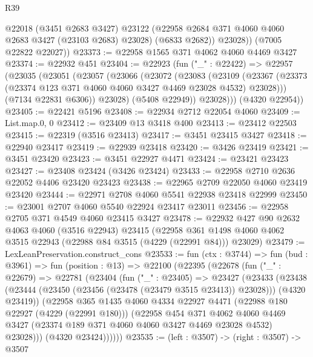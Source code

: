 \begin{lexlean}{R39}
\begin{coremodule}
            @22018
            (@3451 @2683 @3427)
            @23122
            (@22958 @2684 @371 @4060 @4060 @2683 @3427 (@23103 @2683) @23028)
            (@6833 @2682))
          @23028))
      (@7005 @22822 @22027))
@23373 := @22958 @1565 @371 @4062 @4060 @4469 @3427
@23374 := @22932 @451
@23404 := @22923
    (fun ("_" : @22422) =>
    @22957
      (@23035
        (@23051
          (@23057
            (@23066
              (@23072
                (@23083
                  (@23109
                    (@23367
                      (@23373 (@23374 @123 @371 @4060 @4060 @3427 @4469 @23028 @4532) @23028)))
                  (@7134 @22831 @6306))
                @23028)
              (@5408 @22949))
            @23028)))
      (@4320 @22954))
@23405 := @22421 @5196
@23408 := @22934 @2712 @22054 @4060
@23409 := List.map.{0, 0}
@23412 := @23409 @13 @3418 @400
@23413 := @23412 @22503
@23415 := @22319 (@3516 @23413)
@23417 := @3451 @23415 @3427
@23418 := @22940 @23417
@23419 := @22939 @23418
@23420 := @3426 @23419
@23421 := @3451 @23420
@23423 := @3451 @22927 @4471
@23424 := @23421 @23423
@23427 := @23408 @23424 (@3426 @23424)
@23433 := @22958 @2710 @2636 @22052 @4406 @23420 @23423
@23438 := @22965 @2709 @22050 @4060 @23419 @23420
@23444 := @22971 @2708 @4060 @5541 @22938 @23418 @22999
@23450 := @23001 @2707 @4060 @5540 @22924 @23417 @23011
@23456 := @22958 @2705 @371 @4549 @4060 @23415 @3427
@23478 := @22932
    @427
    @90
    @2632
    @4063
    @4060
    (@3516 @22943)
    @23415
    (@22958 @361 @1498 @4060 @4062 @3515 @22943 (@22988 @84 @3515 (@4229 (@22991 @84))) @23029)
@23479 := LexLeanPreservation.construct_cons
@23533 := fun (ctx : @3744) =>
  fun (bud : @3961) =>
  fun (position : @13) =>
  @22100
    (@22395
      (@22678
        (fun ("_" : @22679) =>
        @22781
          (@23404
            (fun ("_" : @23405) =>
            @23427
              (@23433
                (@23438
                  (@23444 (@23450 (@23456 (@23478 (@23479 @3515 @23413)) @23028)))
                  (@4320 @23419))
                (@22958
                  @365
                  @1435
                  @4060
                  @4334
                  @22927
                  @4471
                  (@22988 @180 @22927 (@4229 (@22991 @180)))
                  (@22958
                    @454
                    @371
                    @4062
                    @4060
                    @4469
                    @3427
                    (@23374 @189 @371 @4060 @4060 @3427 @4469 @23028 @4532)
                    @23028)))
              (@4320 @23424))))))
@23535 := (left : @3507) -> (right : @3507) -> @3507

\end{coremodule}
\end{lexlean}
